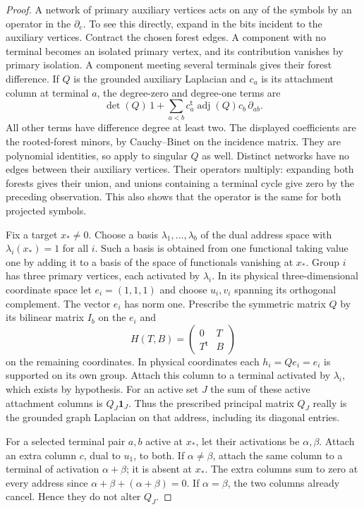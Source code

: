 \begin{proof}
A network of primary auxiliary vertices acts on any of the symbols
by an operator in the $\partial_e$.  To see this directly, expand in
the bits incident to the auxiliary vertices.  Contract the chosen
forest edges.  A component with no terminal becomes an isolated
primary vertex, and its contribution vanishes by primary isolation.
A component meeting several terminals gives their forest difference.
If $Q$ is the grounded auxiliary Laplacian and $c_a$ is its attachment
column at terminal $a$, the degree-zero and degree-one terms are
\[
 \det(Q)\,1+
 \sum_{a<b}c_a^{\mathsf t}\operatorname{adj}(Q)c_b\,
                    \partial_{ab}.
\]
All other terms have difference degree at least two.  The displayed
coefficients are the rooted-forest minors, by Cauchy--Binet on the
incidence matrix.  They are polynomial identities, so apply to
singular $Q$ as well.  Distinct networks have no edges between their
auxiliary vertices.  Their operators multiply: expanding both
forests gives their union, and unions containing a terminal cycle
give zero by the preceding observation.  This also shows that the
operator is the same for both projected symbols.

Fix a target $x_*\ne0$.  Choose a basis
$\lambda_1,\ldots,\lambda_b$ of the dual address space with
$\lambda_i(x_*)=1$ for all $i$.  Such a basis is obtained from one
functional taking value one by adding it to a basis of the space
of functionals vanishing at $x_*$.  Group $i$ has three primary vertices, each activated
by $\lambda_i$.  In its physical three-dimensional coordinate space
let $e_i=(1,1,1)$ and choose $u_i,v_i$ spanning its orthogonal
complement.  The vector $e_i$ has norm one.  Prescribe the symmetric
matrix $Q$ by its bilinear matrix $I_b$ on the $e_i$ and
\[
 H(T,B)=\begin{pmatrix}0&T\\T^{\mathsf t}&B\end{pmatrix}
\]
on the remaining coordinates.  In physical coordinates each
$h_i=Qe_i=e_i$ is supported on its own group.  Attach this column to
a terminal activated by $\lambda_i$, which exists by hypothesis.
For an active set $J$ the sum of these active attachment columns is
$Q_J\mathbf1_J$.  Thus the prescribed principal matrix $Q_J$ really
is the grounded graph Laplacian on that address, including its
diagonal entries.

For a selected terminal pair $a,b$ active at $x_*$, let their
activations be $\alpha,\beta$.  Attach an extra column $c$, dual to
$u_1$, to both.  If $\alpha\ne\beta$, attach the same column to a
terminal of activation $\alpha+\beta$; it is absent at $x_*$.  The
extra columns sum to zero at every address since
$\alpha+\beta+(\alpha+\beta)=0$.  If $\alpha=\beta$, the two
columns already cancel.  Hence they do not alter $Q_J$.


\end{proof}

